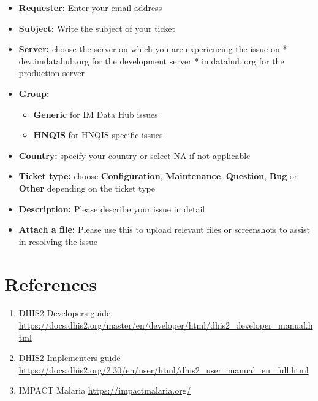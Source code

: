 \documentclass[]{book}
\providecommand{\tightlist}{%
  \setlength{\itemsep}{0pt}\setlength{\parskip}{0pt}}
\begin{document}
\begin{itemize}
\tightlist
\item
  \textbf{Requester:} Enter your email address
\item
  \textbf{Subject:} Write the subject of your ticket
\item
  \textbf{Server:} choose the server on which you are experiencing the issue on
  * dev.imdatahub.org for the development server
  * imdatahub.org for the production server
\item
  \textbf{Group:}

  \begin{itemize}
  \tightlist
  \item
    \textbf{Generic} for IM Data Hub issues
  \item
    \textbf{HNQIS} for HNQIS specific issues
  \end{itemize}
\item
  \textbf{Country:} specify your country or select NA if not applicable
\item
  \textbf{Ticket type:} choose \textbf{Configuration}, \textbf{Maintenance}, \textbf{Question}, \textbf{Bug} or \textbf{Other} depending on the ticket type
\item
  \textbf{Description:} Please describe your issue in detail
\item
  \textbf{Attach a file:} Please use this to upload relevant files or screenshots to assist in resolving the issue
\end{itemize}

\hypertarget{references}{%
\chapter*{References}\label{references}}

\begin{enumerate}
\def\labelenumi{\arabic{enumi}.}
\item
  DHIS2 Developers guide
  \url{https://docs.dhis2.org/master/en/developer/html/dhis2_developer_manual.html}
\item
  DHIS2 Implementers guide
  \url{https://docs.dhis2.org/2.30/en/user/html/dhis2_user_manual_en_full.html}
\item
  IMPACT Malaria
  \url{https://impactmalaria.org/}
\end{enumerate}


\end{document}
